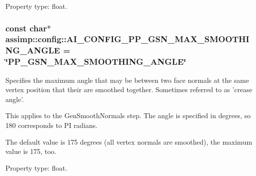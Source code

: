 Property type\+: float. \hypertarget{namespaceassimp_1_1config_a0770ee59900616192ba4542d34605253}{
\subsubsection[{A\+I\+\_\+\+C\+O\+N\+F\+I\+G\+\_\+\+P\+P\+\_\+\+G\+S\+N\+\_\+\+M\+A\+X\+\_\+\+S\+M\+O\+O\+T\+H\+I\+N\+G\+\_\+\+A\+N\+G\+L\+E}]{\setlength{\rightskip}{0pt plus 5cm}const char$\ast$ assimp\+::config\+::\+A\+I\+\_\+\+C\+O\+N\+F\+I\+G\+\_\+\+P\+P\+\_\+\+G\+S\+N\+\_\+\+M\+A\+X\+\_\+\+S\+M\+O\+O\+T\+H\+I\+N\+G\+\_\+\+A\+N\+G\+L\+E = \char`\"{}P\+P\+\_\+\+G\+S\+N\+\_\+\+M\+A\+X\+\_\+\+S\+M\+O\+O\+T\+H\+I\+N\+G\+\_\+\+A\+N\+G\+L\+E\char`\"{}}}\label{namespaceassimp_1_1config_a0770ee59900616192ba4542d34605253}
Specifies the maximum angle that may be between two face normals at the same vertex position that their are smoothed together. Sometimes referred to as 'crease angle'.

This applies to the {\ttfamily Gen\+Smooth\+Normals} step. The angle is specified in degrees, so 180 corresponds to P\+I radians.

The default value is 175 degrees (all vertex normals are smoothed), the maximum value is 175, too.

Property type\+: float.

